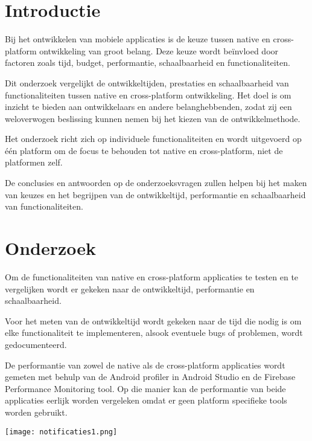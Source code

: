 \documentclass[a0,portrait]{hogent-poster}
\begin{document}
\begin{multicols}{2} %

\section{Introductie}
Bij het ontwikkelen van mobiele applicaties is de keuze tussen native en cross-platform 
ontwikkeling van groot belang. Deze keuze wordt beïnvloed door factoren zoals tijd, budget, 
performantie, schaalbaarheid en functionaliteiten. 

Dit onderzoek vergelijkt de ontwikkeltijden, prestaties en schaalbaarheid van 
functionaliteiten tussen native en cross-platform 
ontwikkeling. Het doel is om inzicht te bieden aan ontwikkelaars en andere belanghebbenden, 
zodat zij een weloverwogen beslissing kunnen nemen bij het kiezen van de ontwikkelmethode.

Het onderzoek richt zich op individuele functionaliteiten en wordt uitgevoerd op één 
platform om de focus te behouden tot native en cross-platform, niet de platformen zelf. 

De conclusies en antwoorden op de 
onderzoeksvragen zullen helpen bij het maken van keuzes en het begrijpen 
van de ontwikkeltijd, performantie en schaalbaarheid van functionaliteiten.

\section{Onderzoek}
Om de functionaliteiten van native en cross-platform applicaties te testen en 
te vergelijken wordt er gekeken naar de ontwikkeltijd, performantie en schaalbaarheid.

Voor het meten van de ontwikkeltijd wordt gekeken naar de tijd die nodig is om elke 
functionaliteit te implementeren, alsook eventuele bugs of problemen, wordt gedocumenteerd.

De performantie van zowel de native als de cross-platform applicaties wordt gemeten 
met behulp van de Android profiler in Android Studio en de Firebase Performance
Monitoring tool. Op die manier kan de performantie van beide applicaties eerlijk worden vergeleken 
omdat er geen platform specifieke tools worden gebruikt.

\begin{center}
  \captionsetup{type=figure}
  \texttt{[image: notificaties1.png]}
\end{center}


\end{multicols}
\end{document}
